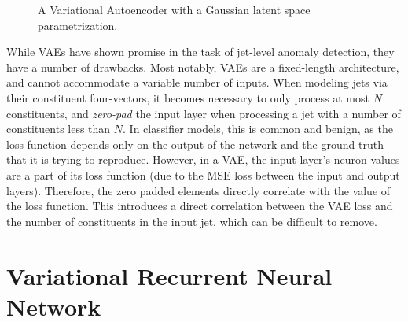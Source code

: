 \documentclass[11pt, a4paper]{article}
\begin{document}
\begin{figure}
\begin{center}
    \caption{A Variational Autoencoder with a Gaussian latent space parametrization.}
    \label{fig:VAE}
  \end{center}
\end{figure}

While VAEs have shown promise in the task of jet-level anomaly detection, they have a number of drawbacks. 
Most notably, VAEs are a fixed-length architecture, and cannot accommodate a variable number of inputs. 
When modeling jets via their constituent four-vectors, it becomes necessary to only process at most $N$ constituents, and \textit{zero-pad} the input layer when processing a jet with a number of constituents less than $N$. 
In classifier models, this is common and benign, as the loss function depends only on the output of the network and the ground truth that it is trying to reproduce. 
However, in a VAE, the input layer's neuron values are a part of its loss function (due to the MSE loss between the input and output layers).
Therefore, the zero padded elements directly correlate with the value of the loss function. 
This introduces a direct correlation between the VAE loss and the number of constituents in the input jet, which can be difficult to remove. 



\section{Variational Recurrent Neural Network}
\end{document}
